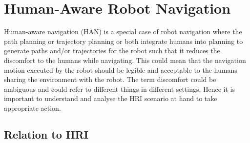 
\section*{Human-Aware Robot Navigation}
Human-aware navigation (HAN) is a special case of robot navigation where the path planning or trajectory planning or both integrate humans into planning to generate paths and/or trajectories for the robot such that it reduces the discomfort to the humans while navigating. This could mean that the navigation motion executed by the robot should be legible and acceptable to the humans sharing the environment with the robot. The term discomfort could be ambiguous and could refer to different things in different settings. Hence it is important to understand and analyse the HRI scenario at hand to take appropriate action.     
\subsection*{Relation to HRI}

